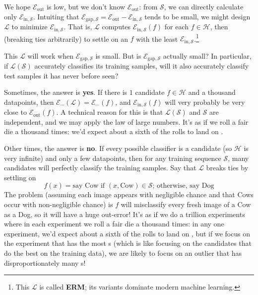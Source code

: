 \documentclass[openany, notitlepage, justified]{tufte-book}
\newcommand{\Ee}{\mathcal{E}}
\newcommand{\Hh}{\mathcal{H}}
\newcommand{\Ll}{\mathcal{L}}
\newcommand{\Ss}{\mathcal{S}}
\newcommand{\Ein}{\Ee_{\text{in},\Ss}}
\newcommand{\Eout}{\Ee_{\text{out}}}
\begin{document}
            We hope $\Eout$ is low, but we don't know
            $\Eout$: from $\Ss$, we can directly calculate only
            $\Ein$.  Intuiting that
            $ 
                \Ee_{\text{gap},\Ss} = \Eout - \Ein
            $ 
            tends to be small, we might design $\Ll$ to minimize $\Ein$.
            That is, $\Ll$ computes $\Ein(f)$ for
            each $f\in \Hh$, then (breaking ties arbitrarily) to settle on an
            $f$ with the least $\Ein$.\footnote{
                This $\Ll$ is called \textbf{ERM}; its variants dominate modern
                machine learning.
            }
            
            This $\Ll$ will work when $\Ee_{\text{gap},\Ss}$ is small.
            But is $\Ee_{\text{gap},\Ss}$ actually small?  In particular, if
            $\Ll(\Ss)$ accurately classifies its training samples, will it also
            accurately classify test samples it has never before seen?

            Sometimes, the answer is \textbf{yes}.
                If there is $1$ candidate $f\in \Hh$ and a thousand
                datapoints, then $\Ee_{\cdots}(\Ll) = \Ee_{\cdots}(f)$, and
                $\Ein(f)$ will very probably be very close to
                $\Eout(f)$.  A technical reason for this is that
                $\Ll(\Ss)$ and $\Ss$ are independent, and we may apply the law
                of large numbers.  It's as if we roll a fair die a thousand
                times: we'd expect about a sixth of the rolls to land on
                .

            Other times, the answer is \textbf{no}.
                If every possible classifier is a candidate (so $\Hh$ is very
                infinite) and only a few datapoints, then for any training
                sequence $\Ss$, many candidates will perfectly classify the
                training samples.  Say that $\Ll$ breaks ties 
                by settling on
                $$
                    f(x) = \text{say Cow if $(x,\text{Cow}) \in \Ss$;
                            otherwise, say Dog}
                $$
                The problem (assuming each image appears with negligible chance
                and that Cows occur with non-negligible chance) is $f$ will
                misclassify every fresh image of a Cow as a Dog, so it will
                have a huge out-error!  It's as if we do a trillion experiments
                where in each experiment we roll a fair die a thousand times:
                in any one experiment, we'd expect about a sixth of the rolls
                to land on , but if we focus on the experiment that
                has the most s (which is like focusing on the
                candidates that do the best on the training data), we are
                likely to focus on an outlier that has disproportionately many
                s!
\end{document}
